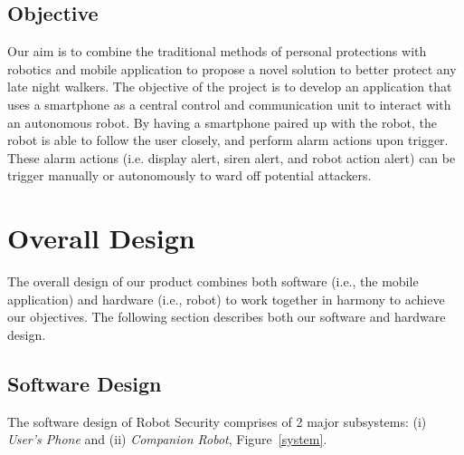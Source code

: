 \documentclass[12pt]{article}
\begin{document}
\subsection{Objective}
Our aim is to combine the traditional methods of personal protections with robotics and mobile application to propose a novel solution to better protect any late night walkers. The objective of the project is to develop an application that uses a smartphone as a central control and communication unit to interact with an autonomous robot. By having a smartphone paired up with the robot, the robot is able to follow the user closely, and perform alarm actions upon trigger. These alarm actions (i.e. display alert, siren alert, and robot action alert) can be trigger manually or autonomously to ward off potential attackers.

\section{Overall Design}
The overall design of our product combines both software (i.e., the mobile application) and hardware (i.e., robot) to work together in harmony to achieve our objectives. The following section describes both our software and hardware design.

\subsection{Software Design}
The software design of Robot Security comprises of 2 major subsystems: (i) \textit{User's Phone} and (ii) \textit{Companion Robot}, Figure~\ref{system}.
\end{document}
